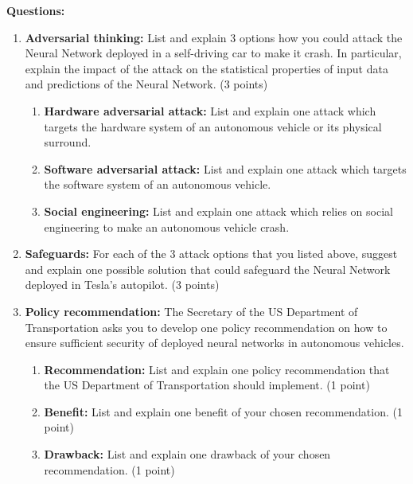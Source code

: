\documentclass[submit]{harvardml}
\begin{document}
\begin{problem}
\textbf{Questions: }

\begin{enumerate}
\item
  \textbf{Adversarial thinking: }List and explain 3 options how you
  could attack the Neural Network deployed in a self-driving car to make
  it crash. In particular, explain the impact of the attack on the
  statistical properties of input data and predictions of the Neural
  Network. (3 points)

  \begin{enumerate}
  \item
    \textbf{Hardware adversarial attack: }List and explain one attack
    which targets the hardware system of an autonomous vehicle or its
    physical surround.
  \item
    \textbf{Software adversarial attack:} List and explain one attack
    which targets the software system of an autonomous vehicle.
  \item
    \textbf{Social engineering:} List and explain one attack which
    relies on social engineering to make an autonomous vehicle crash.
  \end{enumerate}

\item
  \textbf{Safeguards: }For each of the 3 attack options that you listed
  above, suggest and explain one possible solution that could safeguard
  the Neural Network deployed in Tesla's autopilot. (3 points)

\item
  \textbf{Policy recommendation: }The Secretary of the US Department of
  Transportation asks you to develop one policy recommendation on how to
  ensure sufficient security of deployed neural networks in autonomous
  vehicles.

  \begin{enumerate}
  \item
    \textbf{Recommendation:} List and explain one policy recommendation
    that the US Department of Transportation should implement. (1 point)
  \item
    \textbf{Benefit: }List and explain one benefit of your chosen
    recommendation. (1 point)
  \item
    \textbf{Drawback: }List and explain one drawback of your chosen
    recommendation. (1 point)
  \end{enumerate}
\end{enumerate}

\end{problem}
\end{document}
